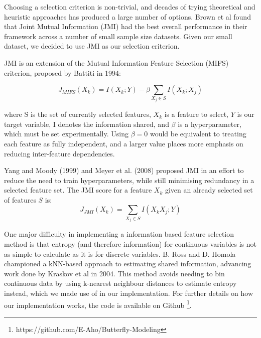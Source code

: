 \documentclass[prl,showpacs,superscriptaddress,twocolumn,longbibliography]{revtex4-1}
\begin{document}
Choosing a selection criterion is non-trivial, and decades of trying theoretical and heuristic approaches has produced a large number of options. Brown et al\cite{Brown2012} found that Joint Mutual Information (JMI)\cite{yang_data_2012} had the best overall performance in their framework across a number of small sample size datasets. Given our small dataset, we decided to use JMI as our selection criterion.

JMI is an extension of the Mutual Information Feature Selection (MIFS) criterion, proposed by Battiti in 1994:

\[ 
    J_{MIFS}(X_k) = I(X_k;Y) - \beta \sum_{X_j\in S} I(X_k;X_j)
\]

where S is the set of currently selected features, $X_k$ is a feature to select, $Y$ is our target variable, I denotes the information shared,  and $ \beta $ is a hyperparameter, which must be set experimentally. Using $\beta  = 0 $ would be equivalent to treating each feature as fully independent, and a larger value places more emphasis on reducing inter-feature dependencies. 

Yang and Moody (1999) and Meyer et al. (2008) proposed JMI in an effort to reduce the need to train hyperparameters, while still minimising redundancy in a selected feature set\cite{Brown2012}. The JMI score for a feature $X_k$ given an already selected set of features $S$ is:
\[ 
    J_{JMI}(X_k) =  \sum_{X_j\in S} I(X_kX_j;Y)
\]

One major difficulty in implementing a information based feature selection method is that entropy (and therefore information) for continuous variables is not as simple to calculate as it is for discrete variables. B. Ross\cite{Ross2014} and D. Homola \cite{Homola2016} championed a kNN-based approach to estimating shared information, advancing work done by Kraskov et al in 2004\cite{kraskov_estimating_2004}. This method avoids needing to bin continuous data by using k-nearest neighbour distances to estimate entropy instead, which we made use of in our implementation. For further details on how our implementation works, the code is available on Github \footnote{https://github.com/E-Aho/Butterfly-Modeling}.
\end{document}
